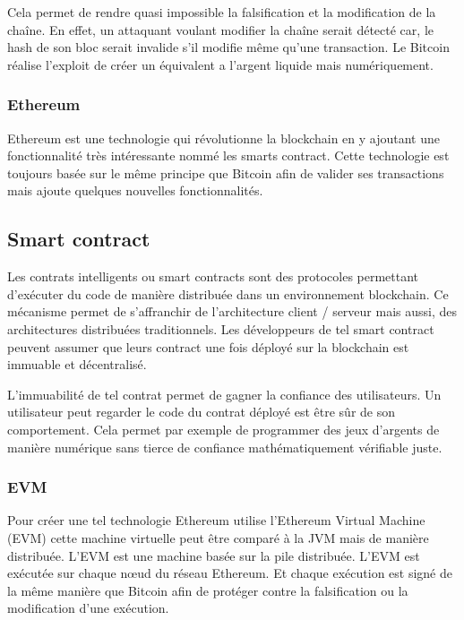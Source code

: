 Cela permet de rendre quasi impossible la falsification et la modification de la chaîne. En effet, un attaquant voulant modifier la chaîne serait
détecté car, le hash de son bloc serait invalide s'il modifie même qu'une transaction. Le Bitcoin réalise l'exploit de créer un équivalent a l'argent
liquide mais numériquement.

\subsubsection{Ethereum}

Ethereum est une technologie qui révolutionne la blockchain en y ajoutant une fonctionnalité très intéressante nommé les smarts contract. Cette
technologie est toujours basée sur le même principe que Bitcoin afin de valider ses transactions mais ajoute quelques nouvelles fonctionnalités.

\subsection{Smart contract}

Les contrats intelligents ou smart contracts sont des protocoles permettant d'exécuter du code de manière distribuée dans un environnement blockchain.
Ce mécanisme permet de s'affranchir de l'architecture client / serveur mais aussi, des architectures distribuées traditionnels. Les développeurs de
tel smart contract peuvent assumer que leurs contract une fois déployé sur la blockchain est immuable et décentralisé.

L'immuabilité de tel contrat permet de gagner la confiance des utilisateurs. Un utilisateur peut regarder le code du contrat déployé est être sûr 
de son comportement. Cela permet par exemple de programmer des jeux d'argents de manière numérique sans tierce de confiance mathématiquement 
vérifiable juste.

\subsubsection{EVM}

Pour créer une tel technologie Ethereum utilise l'Ethereum Virtual Machine (EVM) cette machine virtuelle peut être comparé à la JVM mais de manière distribuée.
L'EVM est une machine basée sur la pile distribuée.
L'EVM est exécutée sur chaque nœud du réseau Ethereum. Et chaque exécution est signé de la même manière que Bitcoin afin de protéger contre la falsification
ou la modification d'une exécution.


